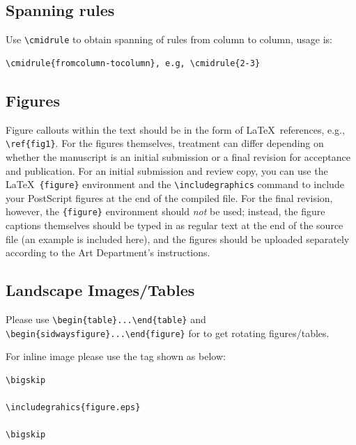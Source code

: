 \documentclass[]{Liebert_Author}
\begin{document}
\subsection*{Spanning rules}

Use \verb!\cmidrule! to obtain spanning of rules from column to
column, usage is:

\begin{verbatim}
\cmidrule{fromcolumn-tocolumn}, e.g, \cmidrule{2-3}
\end{verbatim}

\subsection{Figures}

Figure callouts within the text should be
in the form of \LaTeX\ references, e.g., \verb+\ref{fig1}+.  For the
figures themselves, treatment can differ depending on whether the
manuscript is an initial submission or a final revision for acceptance
and publication.  For an initial submission and review copy, you can
use the \LaTeX\ \verb+{figure}+ environment and the
\verb+\includegraphics+ command to include your PostScript figures at
the end of the compiled file.  For the final revision,
however, the \verb+{figure}+ environment should \textit{not} be used;
instead, the figure captions themselves should be typed in as regular
text at the end of the source file (an example is included here), and
the figures should be uploaded separately according to the Art
Department's instructions.

\subsection*{Landscape Images/Tables}

Please use \verb!\begin{table}...\end{table}! and\\
\verb!\begin{sidwaysfigure}...\end{figure}! for to get rotating figures/tables.

For inline image please use the tag shown as below:

\begin{verbatim}
\bigskip

\includegrahics{figure.eps}

\bigskip
\end{verbatim}
\end{document}
